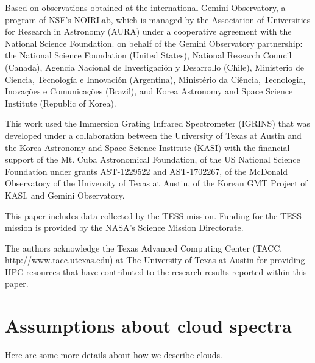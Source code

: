 \documentclass{aastex631}
\begin{document}
\begin{acknowledgements}
Based on observations obtained at the international Gemini Observatory, a program of NSF’s NOIRLab, which is managed by the Association of Universities for Research in Astronomy (AURA) under a cooperative agreement with the National Science Foundation. on behalf of the Gemini Observatory partnership: the National Science Foundation (United States), National Research Council (Canada), Agencia Nacional de Investigaci\'{o}n y Desarrollo (Chile), Ministerio de Ciencia, Tecnolog\'{i}a e Innovaci\'{o}n (Argentina), Minist\'{e}rio da Ci\^{e}ncia, Tecnologia, Inova\c{c}\~{o}es e Comunica\c{c}\~{o}es (Brazil), and Korea Astronomy and Space Science Institute (Republic of Korea).

This work used the Immersion Grating Infrared Spectrometer (IGRINS) that was developed under a collaboration between the University of Texas at Austin and the Korea Astronomy and Space Science Institute (KASI) with the financial support of the Mt. Cuba Astronomical Foundation, of the US National Science Foundation under grants AST-1229522 and AST-1702267, of the McDonald Observatory of the University of Texas at Austin, of the Korean GMT Project of KASI, and Gemini Observatory.

This paper includes data collected by the TESS mission. Funding for the TESS mission is provided by the NASA's Science Mission Directorate.

The authors acknowledge the Texas Advanced Computing Center (TACC, \url{http://www.tacc.utexas.edu}) at The University of Texas at Austin for providing HPC resources that have contributed to the research results reported within this paper.
\end{acknowledgements}

\clearpage








\clearpage

\appendix
\restartappendixnumbering

\section{Assumptions about cloud spectra} \label{appendix:clouds}

Here are some more details about how we describe clouds.
\end{document}
